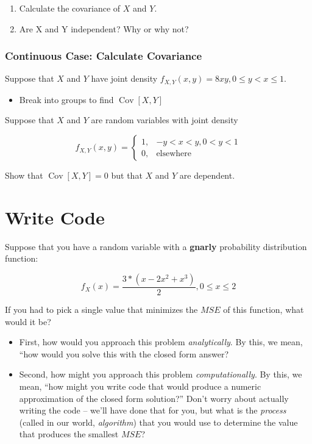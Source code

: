\documentclass[
  letterpaper,
  DIV=11,
  numbers=noendperiod]{scrreprt}
\providecommand{\tightlist}{%
  \setlength{\itemsep}{0pt}\setlength{\parskip}{0pt}}\usepackage{longtable,booktabs,array}
\begin{document}
\begin{enumerate}
\def\labelenumi{\arabic{enumi}.}
\tightlist
\item
  Calculate the covariance of \(X\) and \(Y\).
\item
  Are X and Y independent? Why or why not?
\end{enumerate}

\subsubsection{Continuous Case: Calculate
Covariance}\label{continuous-case-calculate-covariance}

Suppose that \(X\) and \(Y\) have joint density
\(f_{X,Y}(x,y) = 8xy, 0 \leq y < x \leq 1.\)

\begin{itemize}
\tightlist
\item
  Break into groups to find \(\operatorname{Cov}[X,Y]\)
\end{itemize}

Suppose that \(X\) and \(Y\) are random variables with joint density

\[
f_{X,Y}(x,y) = 
\begin{cases} 
 1, & -y < x < y, 0 < y < 1 \\ 
 0, & \textrm{elsewhere}
\end{cases}
\]

Show that \(\operatorname{Cov}[X,Y] = 0\) but that \(X\) and \(Y\) are
dependent.

\section{Write Code}\label{write-code}

Suppose that you have a random variable with a \textbf{gnarly}
probability distribution function:

\[ 
  f_{X}(x) = \frac{3*\left(x - 2x^2 + x^3\right)}{2}, 0\leq x\leq 2
\]

If you had to pick a single value that minimizes the \(MSE\) of this
function, what would it be?

\begin{itemize}
\tightlist
\item
  First, how would you approach this problem \emph{analytically}. By
  this, we mean, ``how would you solve this with the closed form answer?
\item
  Second, how might you approach this problem \emph{computationally}. By
  this, we mean, ``how might you write code that would produce a numeric
  approximation of the closed form solution?'' Don't worry about
  actually writing the code -- we'll have done that for you, but what is
  the \emph{process} (called in our world, \emph{algorithm}) that you
  would use to determine the value that produces the smallest \(MSE\)?
\end{itemize}
\end{document}
